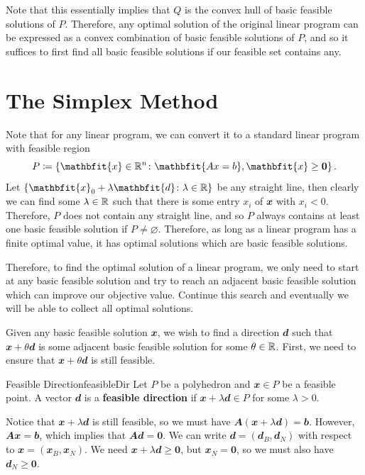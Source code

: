 \documentclass[math, code]{amznotes}
\theoremstyle{remark}
\begin{document}
Note that this essentially implies that $Q$ is the convex hull of basic feasible solutions of $P$. Therefore, any optimal solution of the original linear program can be expressed as a convex combination of basic feasible solutions of $P$, and so it suffices to first find all basic feasible solutions if our feasible set contains any.
\section{The Simplex Method}
Note that for any linear program, we can convert it to a standard linear program with feasible region
\begin{equation*}
    P \coloneqq \left\{\mathbfit{x} \in \R^n \colon \mathbfit{Ax = b}, \mathbfit{x} \geq \mathbf{0}\right\}.
\end{equation*}
Let $\left\{\mathbfit{x}_0 + \lambda\mathbfit{d} \colon \lambda \in \R\right\}$ be any straight line, then clearly we can find some $\lambda \in \mathbb{R}$ such that there is some entry $x_i$ of $\mathbfit{x}$ with $x_i < 0$. Therefore, $P$ does not contain any straight line, and so $P$ always contains at least one basic feasible solution if $P \neq \varnothing$. Therefore, as long as a linear program has a finite optimal value, it has optimal solutions which are basic feasible solutions.

Therefore, to find the optimal solution of a linear program, we only need to start at any basic feasible solution and try to reach an adjacent basic feasible solution which can improve our objective value. Continue this search and eventually we will be able to collect all optimal solutions.

Given any basic feasible solution $\mathbfit{x}$, we wish to find a direction $\mathbfit{d}$ such that $\mathbfit{x} + \theta\mathbfit{d}$ is some adjacent basic feasible solution for some $\theta \in \mathbb{R}$. First, we need to ensure that $\mathbfit{x} + \theta\mathbfit{d}$ is still feasible.
\begin{dfnbox}{Feasible Direction}{feasibleDir}
    Let $P$ be a polyhedron and $\mathbfit{x} \in P$ be a feasible point. A vector $\mathbfit{d}$ is a {\color{red} \textbf{feasible direction}} if $\mathbfit{x} + \lambda\mathbfit{d} \in P$ for some $\lambda > 0$.
\end{dfnbox}
Notice that $\mathbfit{x} + \lambda\mathbfit{d}$ is still feasible, so we must have $\mathbfit{A}(\mathbfit{x} + \lambda\mathbfit{d}) = \mathbfit{b}$. However, $\mathbfit{Ax} = \mathbfit{b}$, which implies that $\mathbfit{Ad} = \mathbf{0}$. We can write $\mathbfit{d} = \left(\mathbfit{d}_B, \mathbfit{d}_N\right)$ with respect to $\mathbfit{x} = \left(\mathbfit{x}_B, \mathbfit{x}_N\right)$. We need $\mathbfit{x} + \lambda\mathbfit{d} \geq \mathbf{0}$, but $\mathbfit{x}_N = \mathbf{0}$, so we must also have $\mathbfit{d}_N \geq \mathbf{0}$.
\end{document}
